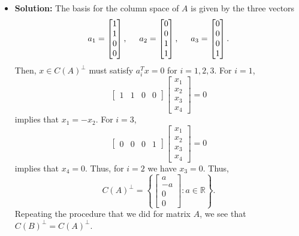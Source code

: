\documentclass[11pt]{article}
\newcommand{\R}{{\mathbb R}}
\begin{document}
\begin{itemize}
\item[] {\bf Solution:}  The basis for the column space of $A$ is given by the three vectors
\[
a_1 = \begin{bmatrix}
1 \\ 1 \\ 0 \\ 0
\end{bmatrix}, \hspace{5mm}
a_2 = \begin{bmatrix}
0 \\ 0 \\ 1 \\ 1
\end{bmatrix}, \hspace{5mm}
a_3 = \begin{bmatrix}
0 \\ 0 \\ 0 \\ 1
\end{bmatrix}.
\]
Then, $x\in C(A)^\perp$ must satisfy $a_i^Tx = 0$ for $i=1,2,3$.  For $i=1$, 
\[
\begin{bmatrix}
1 & 1 & 0 & 0
\end{bmatrix}\begin{bmatrix}
x_1 \\ x_2 \\ x_3 \\ x_4 
\end{bmatrix} = 0
\]
implies that $x_1 = -x_2$.  For $i=3$, 
\[
\begin{bmatrix}
0 & 0 & 0 & 1
\end{bmatrix}\begin{bmatrix}
x_1 \\ x_2 \\ x_3 \\ x_4 
\end{bmatrix} = 0
\] implies that $x_4 = 0$.  Thus, for $i=2$ we have $x_3 = 0$.  Thus, 
\[
C(A)^\perp = \left\{\begin{bmatrix}
a \\ -a \\ 0 \\ 0 
\end{bmatrix}\colon a\in\R \right\}.
\]
Repeating the procedure that we did for matrix $A$, we see that $C(B)^\perp = C(A)^\perp$.
\end{itemize}
\end{document}
